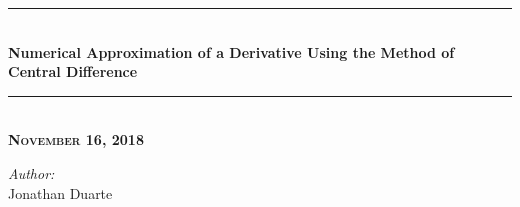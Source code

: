 \begin{titlepage}

\newcommand{\HRule}{\rule{\linewidth}{0.5mm}} %

\center %
 




\HRule \\[0.4cm]
{ \huge \bfseries Numerical Approximation of a Derivative Using the Method of Central Difference}\\[0.4cm] %
\HRule \\[1.5cm]

\textsc{\bf {\large November 16, 2018}} \\
	   \vspace{0.8in}
	   

\emph{Author:}\\
Jonathan Duarte \\ %
~


\end{titlepage}
